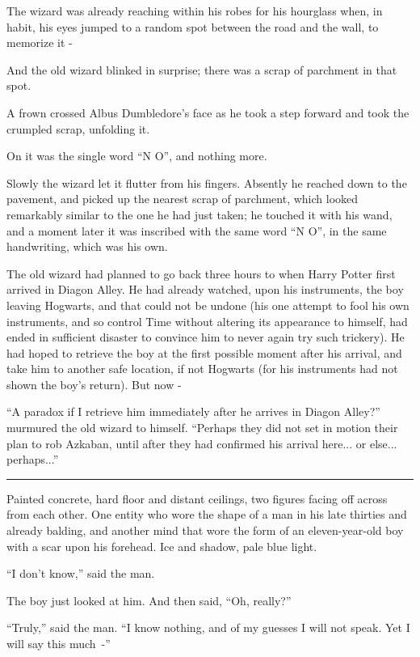 The wizard was already reaching within his robes for his hourglass when, in habit, his eyes jumped to a random spot between the road and the wall, to memorize it -

And the old wizard blinked in surprise; there was a scrap of parchment in that spot.

A frown crossed Albus Dumbledore's face as he took a step forward and took the crumpled scrap, unfolding it.

On it was the single word ``N O'', and nothing more.

Slowly the wizard let it flutter from his fingers. Absently he reached down to the pavement, and picked up the nearest scrap of parchment, which looked remarkably similar to the one he had just taken; he touched it with his wand, and a moment later it was inscribed with the same word ``N O'', in the same handwriting, which was his own.

The old wizard had planned to go back three hours to when Harry Potter first arrived in Diagon Alley. He had already watched, upon his instruments, the boy leaving Hogwarts, and that could not be undone (his one attempt to fool his own instruments, and so control Time without altering its appearance to himself, had ended in sufficient disaster to convince him to never again try such trickery). He had hoped to retrieve the boy at the first possible moment after his arrival, and take him to another safe location, if not Hogwarts (for his instruments had not shown the boy's return). But now -

``A paradox if I retrieve him immediately after he arrives in Diagon Alley?'' murmured the old wizard to himself. ``Perhaps they did not set in motion their plan to rob Azkaban, until after they had confirmed his arrival here... or else... perhaps...''

\begin{center}\rule{3in}{0.4pt}\end{center}

Painted concrete, hard floor and distant ceilings, two figures facing off across from each other. One entity who wore the shape of a man in his late thirties and already balding, and another mind that wore the form of an eleven-year-old boy with a scar upon his forehead. Ice and shadow, pale blue light.

``I don't know,'' said the man.

The boy just looked at him. And then said, ``Oh, really?''

``Truly,'' said the man. ``I know nothing, and of my guesses I will not speak. Yet I will say this much~-''
